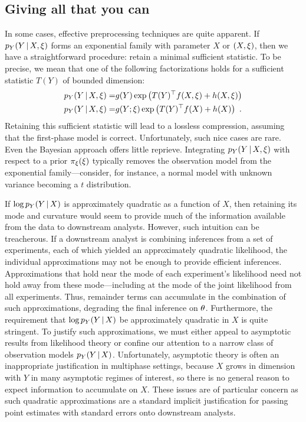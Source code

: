 \subsection{Giving all that you can}
\label{multiphase:sec:completeclass}

In some cases, effective preprocessing techniques are quite apparent.
If $p_Y(Y \, | \, X, \xi)$ forms an exponential family with parameter $X$ or $(X, \xi)$, then we have a straightforward procedure: retain a minimal sufficient statistic.
To be precise, we mean that one of the following factorizations holds for a sufficient statistic $T(Y)$ of bounded dimension:
\begin{align}
 \nonumber
 p_Y(Y \, | \, X, \xi) =& g(Y) \exp\left(T(Y)^\top f(X, \xi) + h(X, \xi)\right) \\
 \nonumber
 p_Y(Y \, | \, X, \xi) =& g(Y; \xi) \exp\left(T(Y)^\top f(X) + h(X)\right)\ .
\end{align}
Retaining this sufficient statistic will lead to a lossless compression,  assuming that the first-phase model is correct.
Unfortunately, such nice cases are rare.
Even the Bayesian approach offers little reprieve.
Integrating $p_Y(Y \, | \, X, \xi)$ with respect to a prior $\pi_{\xi}(\xi)$ typically removes the observation model from the exponential family---consider, for instance, a normal model with unknown variance becoming a $t$ distribution.

If $\log p_Y(Y \, | \, X)$ is approximately quadratic as a function of $X$, then retaining its mode and curvature would seem to provide much of the information available from the data to downstream analysts.
However, such intuition can be treacherous.
If a downstream analyst is combining inferences from a set of experiments, each of which yielded an approximately quadratic likelihood, the individual approximations may not be enough to provide efficient inferences.
Approximations that hold near the mode of each experiment's likelihood need not hold away from these mode---including at the mode of the joint likelihood from all experiments.
Thus, remainder terms can accumulate in the combination of such approximations, degrading the final inference on $\theta$.
Furthermore, the requirement that $\log p_Y(Y \, | \, X)$ be approximately quadratic in $X$ is quite stringent.
To justify such approximations, we must either appeal to asymptotic results from likelihood theory or confine our attention to a narrow class of observation models $p_Y(Y \, | \, X)$.
Unfortunately, asymptotic theory is often an inappropriate justification in multiphase settings, because 
$X$ grows in dimension with $Y$ in many asymptotic regimes of interest, so there is no general reason to expect information to accumulate on $X$.
These issues are of particular concern as such quadratic approximations are a standard implicit justification for passing point estimates with standard errors onto downstream analysts.

